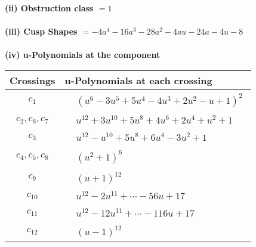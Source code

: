 \documentclass[1p]{elsarticle_modified}
\theoremstyle{definition}
\begin{document}
\flushleft \textbf{(ii) Obstruction class $= 1$}\\~\\
\flushleft \textbf{(iii) Cusp Shapes $= -4 a^4-16 a^3-28 a^2-4 a u-24 a-4 u-8$}\\~\\
\newpage\renewcommand{\arraystretch}{1}
\flushleft \textbf{(iv) u-Polynomials at the component}\newline \\
\begin{tabular}{m{50pt}|m{274pt}}
Crossings & \hspace{64pt}u-Polynomials at each crossing \\
\hline $$\begin{aligned}c_{1}\end{aligned}$$&$\begin{aligned}
&(u^6-3 u^5+5 u^4-4 u^3+2 u^2- u+1)^2
\end{aligned}$\\
\hline $$\begin{aligned}c_{2},c_{6},c_{7}\end{aligned}$$&$\begin{aligned}
&u^{12}+3 u^{10}+5 u^8+4 u^6+2 u^4+u^2+1
\end{aligned}$\\
\hline $$\begin{aligned}c_{3}\end{aligned}$$&$\begin{aligned}
&u^{12}- u^{10}+5 u^8+6 u^4-3 u^2+1
\end{aligned}$\\
\hline $$\begin{aligned}c_{4},c_{5},c_{8}\end{aligned}$$&$\begin{aligned}
&(u^2+1)^6
\end{aligned}$\\
\hline $$\begin{aligned}c_{9}\end{aligned}$$&$\begin{aligned}
&(u+1)^{12}
\end{aligned}$\\
\hline $$\begin{aligned}c_{10}\end{aligned}$$&$\begin{aligned}
&u^{12}-2 u^{11}+\cdots-56 u+17
\end{aligned}$\\
\hline $$\begin{aligned}c_{11}\end{aligned}$$&$\begin{aligned}
&u^{12}-12 u^{11}+\cdots-116 u+17
\end{aligned}$\\
\hline $$\begin{aligned}c_{12}\end{aligned}$$&$\begin{aligned}
&(u-1)^{12}
\end{aligned}$\\
\hline
\end{tabular}\\~\\
\end{document}
